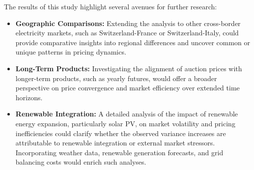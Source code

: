 \documentclass[12pt]{article}
\begin{document}
The results of this study highlight several avenues for further research:
\begin{itemize}
    \item \textbf{Geographic Comparisons:} Extending the analysis to other cross-border electricity markets, such as Switzerland-France or Switzerland-Italy, could provide comparative insights into regional differences and uncover common or unique patterns in pricing dynamics.
    \item \textbf{Long-Term Products:} Investigating the alignment of auction prices with longer-term products, such as yearly futures, would offer a broader perspective on price convergence and market efficiency over extended time horizons.
    \item \textbf{Renewable Integration:} A detailed analysis of the impact of renewable energy expansion, particularly solar PV, on market volatility and pricing inefficiencies could clarify whether the observed variance increases are attributable to renewable integration or external market stressors. Incorporating weather data, renewable generation forecasts, and grid balancing costs would enrich such analyses.
\end{itemize}



\end{document}
